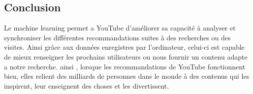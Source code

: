 \documentclass[12pt,a4paper]{article}
\begin{document}
\begin{center}
\newpage
\section*{Conclusion}
\end{center}
Le machine learning permet a YouTube d'améliorer sa capacité à analyser et synchroniser les différentes recommandations suites à des recherches ou des visites. Ainsi grâce aux données enregistres par l'ordinateur, celui-ci est capable de mieux renseigner les prochains utilisateurs ou nous fournir un contenu adapte a notre recherche. ainsi , lorsque les recommandations de YouTube fonctionnent bien, elles relient des milliards de personnes dans le monde à des contenus qui les inspirent, leur enseignent des choses et les divertissent.

 
\newpage


\end{document}
